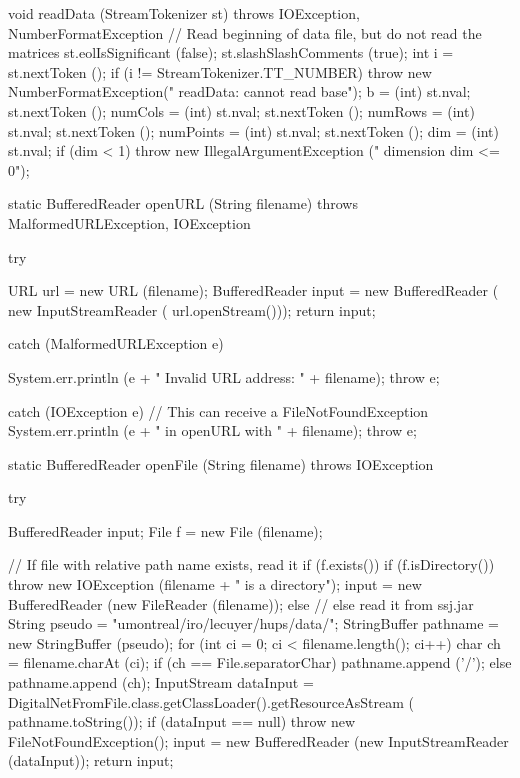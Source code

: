 \begin{code}
\begin{hide}
{   void readData (StreamTokenizer st) throws
                                      IOException, NumberFormatException
   {
      // Read beginning of data file, but do not read the matrices
      st.eolIsSignificant (false);
      st.slashSlashComments (true);
      int i = st.nextToken ();
      if (i != StreamTokenizer.TT_NUMBER)
         throw new NumberFormatException(" readData: cannot read base");
      b = (int) st.nval;
      st.nextToken ();   numCols = (int) st.nval;
      st.nextToken ();   numRows = (int) st.nval;
      st.nextToken ();   numPoints = (int) st.nval;
      st.nextToken ();   dim = (int) st.nval;
      if (dim < 1)
         throw new IllegalArgumentException (" dimension dim <= 0");
   }


   static BufferedReader openURL (String filename)
                                  throws MalformedURLException, IOException {
      try {
         URL url = new URL (filename);
         BufferedReader input = new BufferedReader (
                                    new InputStreamReader (
                                        url.openStream()));
         return input;

      } catch (MalformedURLException e) {
         System.err.println (e + "   Invalid URL address:   " + filename);
         throw e;

      }  catch (IOException e) {
          // This can receive a FileNotFoundException
         System.err.println (e + " in openURL with " + filename);
         throw e;
      }
   }

   static BufferedReader openFile (String filename) throws
            IOException {
      try {
         BufferedReader input;
         File f = new File (filename);

         // If file with relative path name exists, read it
         if (f.exists()) {
            if (f.isDirectory())
               throw new IOException (filename + " is a directory");
            input = new BufferedReader (new FileReader (filename));
         } else {              // else read it from ssj.jar
            String pseudo = "umontreal/iro/lecuyer/hups/data/";
            StringBuffer pathname = new StringBuffer (pseudo);
            for (int ci = 0; ci < filename.length(); ci++) {
               char ch = filename.charAt (ci);
               if (ch == File.separatorChar)
                  pathname.append ('/');
               else
                  pathname.append (ch);
            }
            InputStream dataInput =
                DigitalNetFromFile.class.getClassLoader().getResourceAsStream (
                  pathname.toString());
            if (dataInput == null)
               throw new FileNotFoundException();
            input = new BufferedReader (new InputStreamReader (dataInput));
         }
         return input;

}}}
\end{hide}
\end{code}
